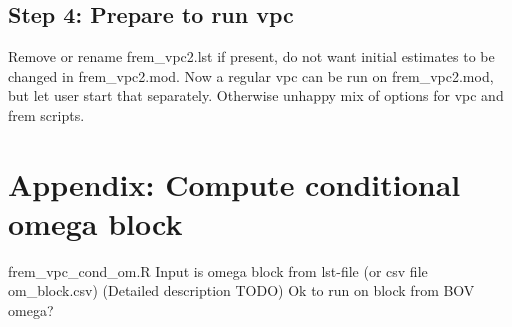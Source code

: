 \documentclass[a4paper,12pt]{article}
\begin{document}
\subsection{Step 4: Prepare to run  vpc}
Remove or rename frem\_vpc2.lst if present, do not want initial estimates to be changed in frem\_vpc2.mod.
Now a regular vpc can be run on frem\_vpc2.mod, but let user start that separately. Otherwise unhappy mix of options for vpc and frem scripts.

\section{Appendix: Compute conditional omega block}
frem\_vpc\_cond\_om.R
Input is omega block from lst-file (or csv file om\_block.csv) 
(Detailed description TODO)
Ok to run on block from BOV omega?
\end{document}
